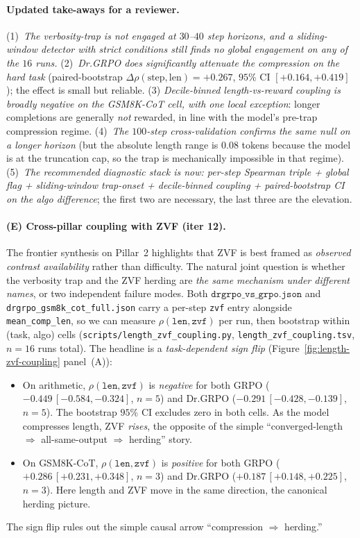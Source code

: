 \paragraph{Updated take-aways for a reviewer.}
(1)~\emph{The verbosity-trap is not engaged at $30$--$40$ step
horizons, and a sliding-window detector with strict
conditions still finds no global engagement on any of the
$16$ runs.} (2)~\emph{Dr.GRPO does \emph{significantly}
attenuate the compression on the hard task} (paired-bootstrap
$\Delta\rho(\text{step},\text{len})=+0.267$, $95\%$ CI
$[+0.164,+0.419]$); the effect is small but reliable. (3)
\emph{Decile-binned length-vs-reward coupling is broadly
\emph{negative} on the GSM8K-CoT cell, with one local exception}:
longer completions are generally
\emph{not} rewarded, in line with the model's
pre-trap compression regime. (4)~\emph{The $100$-step
cross-validation confirms the same null on a longer horizon}
(but the absolute length range is $0.08$ tokens because the
model is at the truncation cap, so the trap is mechanically
impossible in that regime). (5)~\emph{The recommended
diagnostic stack is now: per-step Spearman triple + global flag
+ sliding-window trap-onset + decile-binned coupling +
paired-bootstrap CI on the algo difference}; the first two are
necessary, the last three are the elevation.

\paragraph{(E) Cross-pillar coupling with ZVF (iter 12).}
The frontier synthesis on Pillar~2 highlights that ZVF is best
framed as \emph{observed contrast availability} rather than
difficulty. The natural joint question is whether the verbosity
trap and the ZVF herding are \emph{the same mechanism under
different names}, or two independent failure modes. Both
$\texttt{drgrpo\_vs\_grpo.json}$ and
\texttt{drgrpo\_gsm8k\_cot\_full.json} carry a per-step
\texttt{zvf} entry alongside \texttt{mean\_comp\_len}, so we can
measure $\rho(\texttt{len}, \texttt{zvf})$ per run, then bootstrap
within (task, algo) cells
(\texttt{scripts/length\_zvf\_coupling.py},
\texttt{length\_zvf\_coupling.tsv}, $n{=}16$ runs total).
The headline is a \emph{task-dependent sign flip}
(Figure~\ref{fig:length-zvf-coupling} panel~(A)):
\begin{itemize}
\item On arithmetic, $\rho(\texttt{len}, \texttt{zvf})$ is
  \emph{negative} for both GRPO ($-0.449\,[-0.584,-0.324]$, $n{=}5$)
  and Dr.GRPO ($-0.291\,[-0.428,-0.139]$, $n{=}5$). The bootstrap
  $95\%$ CI excludes zero in both cells. As the model compresses
  length, ZVF \emph{rises}, the opposite of the simple
  ``converged-length $\Rightarrow$ all-same-output $\Rightarrow$
  herding'' story.
\item On GSM8K-CoT, $\rho(\texttt{len}, \texttt{zvf})$ is
  \emph{positive} for both GRPO ($+0.286\,[+0.231,+0.348]$, $n{=}3$)
  and Dr.GRPO ($+0.187\,[+0.148,+0.225]$, $n{=}3$). Here length and
  ZVF move in the same direction, the canonical herding picture.
\end{itemize}
The sign flip rules out the simple causal arrow
``compression $\Rightarrow$ herding.''

